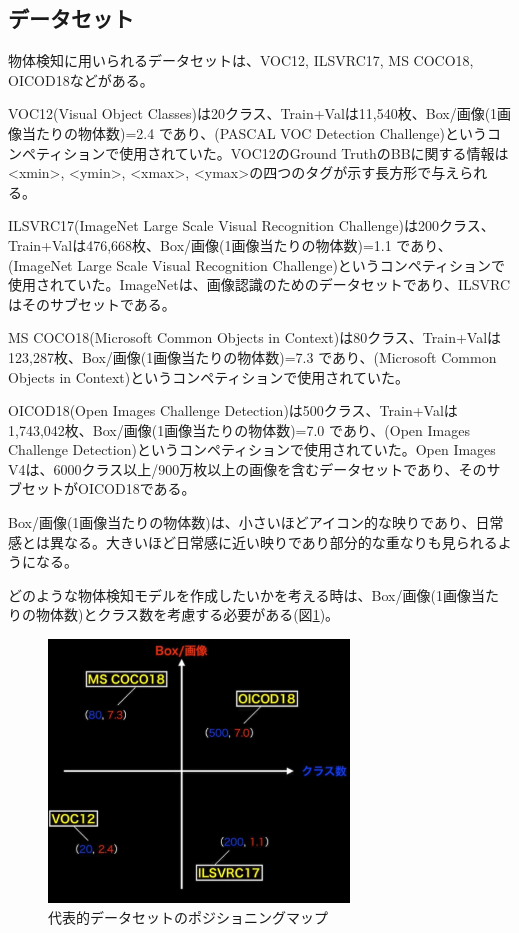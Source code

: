 \documentclass{ltjsarticle}
\begin{document}
\subsection{データセット}
物体検知に用いられるデータセットは、VOC12, ILSVRC17, MS COCO18, OICOD18などがある。
\par
VOC12(Visual Object Classes)は20クラス、Train+Valは11,540枚、Box/画像(1画像当たりの物体数)=2.4 であり、(PASCAL VOC Detection Challenge)というコンペティションで使用されていた。VOC12のGround TruthのBBに関する情報は<xmin>, <ymin>, <xmax>, <ymax>の四つのタグが示す長方形で与えられる。
\par
ILSVRC17(ImageNet Large Scale Visual Recognition Challenge)は200クラス、Train+Valは476,668枚、Box/画像(1画像当たりの物体数)=1.1 であり、(ImageNet Large Scale Visual Recognition Challenge)というコンペティションで使用されていた。ImageNetは、画像認識のためのデータセットであり、ILSVRCはそのサブセットである。
\par
MS COCO18(Microsoft Common Objects in Context)は80クラス、Train+Valは123,287枚、Box/画像(1画像当たりの物体数)=7.3 であり、(Microsoft Common Objects in Context)というコンペティションで使用されていた。
\par
OICOD18(Open Images Challenge Detection)は500クラス、Train+Valは1,743,042枚、Box/画像(1画像当たりの物体数)=7.0 であり、(Open Images Challenge Detection)というコンペティションで使用されていた。Open Images V4は、6000クラス以上/900万枚以上の画像を含むデータセットであり、そのサブセットがOICOD18である。
\par
Box/画像(1画像当たりの物体数)は、小さいほどアイコン的な映りであり、日常感とは異なる。大きいほど日常感に近い映りであり部分的な重なりも見られるようになる。
\par
どのような物体検知モデルを作成したいかを考える時は、Box/画像(1画像当たりの物体数)とクラス数を考慮する必要がある(図\ref{fig:BoxFig_Class})。

\begin{figure}[htbp]
  \centering
  \includegraphics[width=8cm]{./capture/BoxFig_Class.png}
  \caption{代表的データセットのポジショニングマップ}
  \label{fig:BoxFig_Class}
\end{figure}
\end{document}
